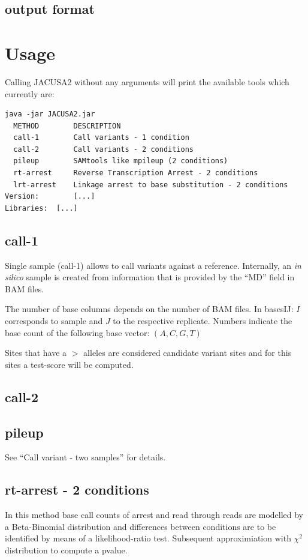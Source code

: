 \documentclass[10pt,a4paper]{article} \usepackage[utf8]{inputenc}
\begin{document}
\subsection{\lrtarrest output format}
\section{Usage}
Calling JACUSA2 without any arguments will print the available tools which currently are:
\begin{verbatim}
java -jar JACUSA2.jar
  METHOD        DESCRIPTION
  call-1        Call variants - 1 condition
  call-2        Call variants - 2 conditions
  pileup        SAMtools like mpileup (2 conditions)
  rt-arrest     Reverse Transcription Arrest - 2 conditions
  lrt-arrest    Linkage arrest to base substitution - 2 conditions
Version: 		[...]
Libraries: 	[...]
\end{verbatim}
\subsection{call-1}
Single sample (call-1) allows to call variants against a reference. 
Internally, an \textit{in silico} sample is created from information that is provided by the ``MD'' field 
in BAM files.

The number of base columns depends on the number of BAM files. In basesIJ: $I$
corresponds to sample and $J$ to the respective replicate. Numbers indicate the base count of the
following base vector: $(A, C, G, T)$

Sites that have a $>$ alleles are considered candidate variant sites and for this sites a test-score will be computed.
\subsection{call-2}
\subsection{pileup}
See ``Call variant - two samples'' for details.
\subsection{rt-arrest - 2 conditions}
In this method base call counts of arrest and read through reads are modelled by a Beta-Binomial distribution and 
differences between conditions are to be identified by means of a likelihood-ratio test. Subsequent approximiation 
with $\chi^2$ distribution to compute a pvalue.
\end{document}
